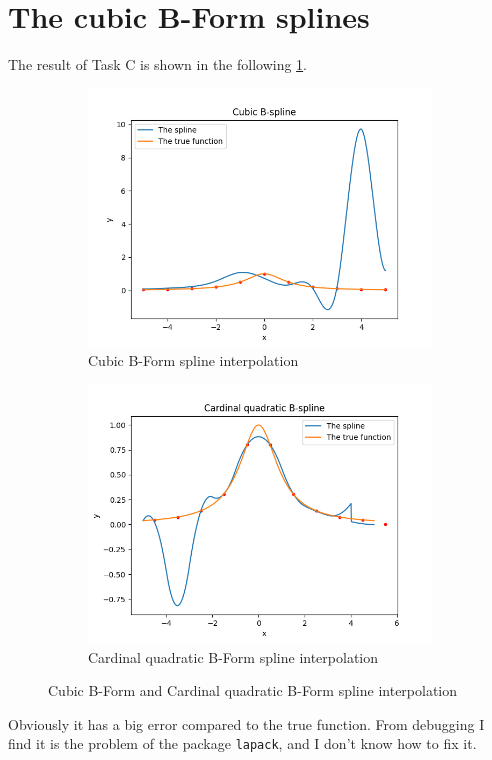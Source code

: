 \documentclass[a4paper]{article}
\begin{document}
\section{The cubic B-Form splines}

The result of Task C is shown in the following \cref{fig:cubic_bform_spline}.
\begin{figure}[htbp]
  \centering
  \begin{subfigure}[b]{0.45\textwidth}
    \includegraphics[width = \textwidth]{../figure/Cubic B-spline.png}
    \caption{Cubic B-Form spline interpolation}
  \end{subfigure}
  \hfill
  \begin{subfigure}[b]{0.45\textwidth}
    \centering
    \includegraphics[width = \textwidth]{../figure/Cardinal quadratic B-spline.png}
    \caption{Cardinal quadratic B-Form spline interpolation}
  \end{subfigure}
  \caption{Cubic B-Form and Cardinal quadratic B-Form spline interpolation}
  \label{fig:cubic_bform_spline}
\end{figure}
Obviously it has a big error compared to the true function. From debugging I find it is the problem of the package \verb|lapack|, and I don't know how to fix it.
\end{document}
